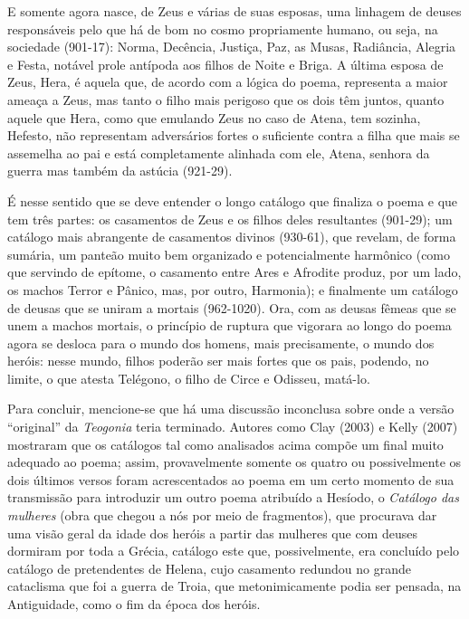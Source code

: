 E somente agora nasce, de Zeus e várias de suas esposas, uma linhagem de
deuses responsáveis pelo que há de bom no cosmo propriamente humano, ou
seja, na sociedade (901-17): Norma, Decência, Justiça, Paz, as Musas,
Radiância, Alegria e Festa, notável prole antípoda aos filhos de Noite e
Briga. A última esposa de Zeus, Hera, é aquela que, de acordo com a
lógica do poema, representa a maior ameaça a Zeus, mas tanto o filho
mais perigoso que os dois têm juntos, quanto aquele que Hera, como que
emulando Zeus no caso de Atena, tem sozinha, Hefesto, não representam
adversários fortes o suficiente contra a filha que mais se assemelha ao
pai e está completamente alinhada com ele, Atena, senhora da guerra mas
também da astúcia (921-29).

É nesse sentido que se deve entender o longo catálogo que finaliza o
poema e que tem três partes: os casamentos de Zeus e os filhos deles
resultantes (901-29); um catálogo mais abrangente de casamentos divinos
(930-61), que revelam, de forma sumária, um panteão muito bem organizado
e potencialmente harmônico (como que servindo de epítome, o casamento
entre Ares e Afrodite produz, por um lado, os machos Terror e Pânico,
mas, por outro, Harmonia); e finalmente um catálogo de deusas que se
uniram a mortais (962-1020). Ora, com as deusas fêmeas que se unem a
machos mortais, o princípio de ruptura que vigorara ao longo do poema
agora se desloca para o mundo dos homens, mais precisamente, o mundo dos
heróis: nesse mundo, filhos poderão ser mais fortes que os pais,
podendo, no limite, o que atesta Telégono, o filho de Circe e Odisseu,
matá-lo.

Para concluir, mencione-se que há uma discussão inconclusa sobre onde a
versão ``original'' da \emph{Teogonia} teria terminado. Autores como
Clay (2003) e Kelly (2007) mostraram que os catálogos tal como
analisados acima compõe um final muito adequado ao poema; assim,
provavelmente somente os quatro ou possivelmente os dois últimos versos
foram acrescentados ao poema em um certo momento de sua transmissão para
introduzir um outro poema atribuído a Hesíodo, o \emph{Catálogo das
mulheres} (obra que chegou a nós por meio de fragmentos), que procurava
dar uma visão geral da idade dos heróis a partir das mulheres que com
deuses dormiram por toda a Grécia, catálogo este que, possivelmente, era
concluído pelo catálogo de pretendentes de Helena, cujo casamento
redundou no grande cataclisma que foi a guerra de Troia, que
metonimicamente podia ser pensada, na Antiguidade, como o fim da época
dos heróis.

